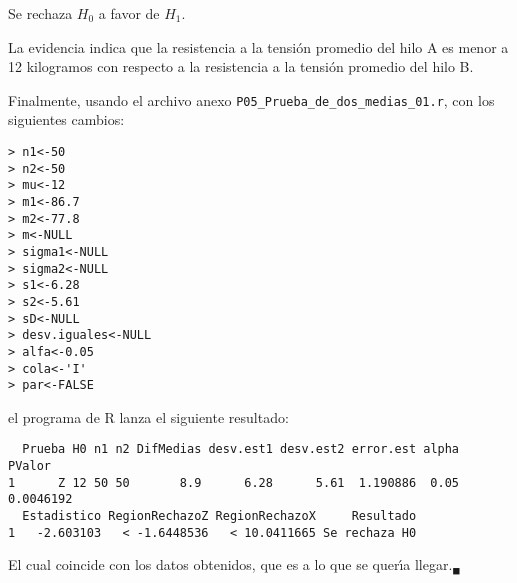 \begin{solucion}
 \begin{decision}
  Se rechaza $H_0$ a favor de $H_1$.
 \end{decision}

 \begin{conclusion}
  La evidencia indica que la resistencia a la tensi\'on promedio del hilo A es menor a 12 kilogramos con respecto a la resistencia a la tensi\'on promedio del hilo B.
 \end{conclusion}

 Finalmente, usando el archivo anexo
 \texttt{P05\_Prueba\_de\_dos\_medias\_01.r},
 con los siguientes cambios:
 \begin{verbatim}
> n1<-50
> n2<-50
> mu<-12
> m1<-86.7
> m2<-77.8
> m<-NULL
> sigma1<-NULL
> sigma2<-NULL
> s1<-6.28
> s2<-5.61
> sD<-NULL
> desv.iguales<-NULL
> alfa<-0.05
> cola<-'I'
> par<-FALSE
 \end{verbatim}
 \vspace{-0.5cm}
 el programa de R lanza el siguiente resultado:
 \begin{verbatim}
  Prueba H0 n1 n2 DifMedias desv.est1 desv.est2 error.est alpha    PValor
1      Z 12 50 50       8.9      6.28      5.61  1.190886  0.05 0.0046192
  Estadistico RegionRechazoZ RegionRechazoX     Resultado
1   -2.603103   < -1.6448536   < 10.0411665 Se rechaza H0
 \end{verbatim}
 \vspace{-0.5cm}
 El cual coincide con los datos obtenidos,
 que es a lo que se quer\'{\i}a llegar.${}_{\blacksquare}$
\end{solucion}
